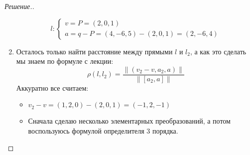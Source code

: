 \documentclass[a4paper]{article}
\theoremstyle{remark}
\newcommand{\eq}[1]{\begin{cases} #1 \end{cases}}
\begin{document}
\begin{proof}[Решение.]
\begin{enumerate}
                \[
                    l \colon \eq{
                        v = P = (2, 0, 1)\\
                        a = q - P = (4, -6, 5) -  (2, 0, 1) = (2, -6, 4)
                    }
                \]
                \item Осталось только найти расстояние между прямыми $l$ и $l_2$, 
                а как это сделать  мы знаем по формуле с лекции: 
                \[
                    \rho(l, l_2) = \frac{\| (v_2 - v, a_2, a)\|}{\| [a_2, a]\|}  
                \]
                Аккуратно все считаем: 
                \begin{itemize} 
                    \item $v_2 - v = (1, 2, 0) - (2, 0, 1) = (-1, 2, -1)$
                    \item Сначала сделаю несколько элементарных преобразований, а потом воспользуюсь 
                    формулой определителя 3 порядка. 


\end{itemize}
\end{enumerate}
\end{proof}
\end{document}
